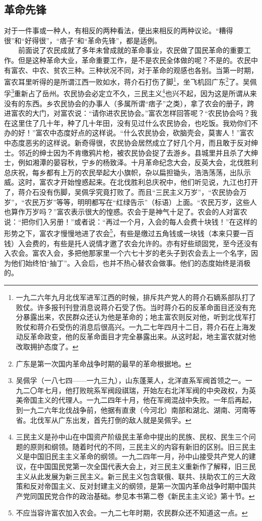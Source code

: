 \documentclass[cn,11pt,chinese]{elegantbook}
\def\myformat#1{\hfil\hfil #1}
\begin{document}
\subsection*{\myformat{革命先锋}}
对于一件事或一种人，有相反的两种看法，便出来相反的两种议论。“糟得很”和“好得很”，“痞子”和“革命先锋”，都是适例。\\
　　前面说了农民成就了多年未曾成就的革命事业，农民做了国民革命的重要工作。但是这种革命大业，革命重要工作，是不是农民全体做的呢？不是的。农民中有富农、中农、贫农三种。三种状况不同，对于革命的观感也各别。当第一时期，富农耳里听得的是所谓江西一败如水，蒋介石打伤了脚\footnote[5]{ 一九二六年九月北伐军进军江西的时候，排斥共产党人的蒋介石嫡系部队打了败仗。许多报刊刊登消息说蒋介石受了伤。当时蒋介石的反革命面目还没有充分暴露出来，农民群众还认为他是革命的；地主富农则反对他，听到北伐军打败仗和蒋介石受伤的消息后很高兴。一九二七年四月十二日，蒋介石在上海发动反革命政变，他的反革命面目才完全暴露出来。从这时起，地主富农就对他改取拥护态度了。}，坐飞机回广东\footnote[6]{ 广东是第一次国内革命战争时期的最早的革命根据地。}了。吴佩孚\footnote[7]{ 吴佩孚（一八七四——一九三九），山东蓬莱人，北洋直系军阀首领之一。一九二〇年七月，他打败皖系军阀段祺瑞，开始左右北洋军阀的中央政权，为英美帝国主义的代理人。一九二四年十月，他在军阀混战中失败。一年后再起，到一九二六年北伐战争前，他据有直隶（今河北）南部和湖北、湖南、河南等省。北伐军从广东出发，首先打倒的敌人就是吴佩孚。}重新占了岳州。农民协会必定立不久，三民主义\footnote[8]{ 三民主义是孙中山在中国资产阶级民主革命中提出的民族、民权、民生三个问题的原则和纲领。随着时代的不同，三民主义的内容有新旧的区别。旧三民主义是中国旧民主主义革命的纲领。一九二四年一月，孙中山接受共产党人的建议，在中国国民党第一次全国代表大会上，对三民主义重新作了解释，旧三民主义从此发展为新三民主义。新三民主义包含联俄、联共、扶助农工的三大政策和反对帝国主义、反对封建主义的纲领，是第一次国内革命战争时期中国共产党同国民党合作的政治基础。参见本书第二卷《新民主主义论》第十节。}也兴不起，因为这是所谓从来没有的东西。乡农民协会的办事人（多属所谓“痞子”之类），拿了农会的册子，跨进富农的大门，对富农说：“请你进农民协会。”富农怎样回答呢？“农民协会吗？我在这里住了几十年，种了几十年田，没有见过什么农民协会，也吃饭。我劝你们不办的好！”富农中态度好点的这样说。“什么农民协会，砍脑壳会，莫害人！”富农中态度恶劣的这样说。新奇得很，农民协会居然成立了好几个月，而且敢于反对绅士。邻近的绅士因为不肯缴鸦片枪，被农民协会捉了去游乡。县城里并且杀了大绅士，例如湘潭的晏容秋，宁乡的杨致泽。十月革命纪念大会，反英大会，北伐胜利总庆祝，每乡都有上万的农民举起大小旗帜，杂以扁担锄头，浩浩荡荡，出队示威。这时，富农才开始惶惑起来。在北伐胜利总庆祝中，他们听见说，九江也打开了，蒋介石没有伤脚，吴佩孚究竟打败了。而且“三民主义万岁”，“农民协会万岁”，“农民万岁”等等，明明都写在“红绿告示”（标语）上面。“农民万岁，这些人也算作万岁吗？”富农表示很大的惶惑。农会于是神气十足了。农会的人对富农说：“把你们入另册！”或者说：“再过一个月，入会的每人会费十块钱！”在这样的形势之下，富农才慢慢地进了农会\footnote[9]{ 不应当容许富农加入农会。一九二七年时期，农民群众还不知道这一点。}，有些是缴过五角钱或一块钱（本来只要一百钱）入会费的，有些是托人说情才邀了农会允许的。亦有好些顽固党，至今还没有入农会。富农入会，多把他那家里一个六七十岁的老头子到农会去上一个名字，因为他们始终怕“抽丁”。入会后，也并不热心替农会做事。他们的态度始终是消极的。\\
\end{document}
